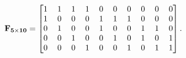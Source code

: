 \documentclass[journal]{IEEEtran}
\begin{document}
\begin{equation}\label{factor_510}
 \small
\setlength{\arraycolsep}{1pt}
\begin{aligned} \mathbf {F_{5 \times 10}}=\left [{ 
\begin{matrix} 
1 &\quad 1 &\quad 1 &\quad 1 &\quad 0 &\quad 0 &\quad 0 &\quad 0 &\quad 0 &\quad 0\\ 
1 &\quad 0 &\quad 0 &\quad 0 &\quad 1 &\quad 1 &\quad 1 &\quad 0 &\quad 0 &\quad 0\\ 
0 &\quad 1 &\quad 0 &\quad 0 &\quad 1 &\quad 0 &\quad 0 &\quad 1 &\quad 1 &\quad 0\\ 
0 &\quad 0 &\quad 1 &\quad 0 &\quad 0 &\quad 1 &\quad 0 &\quad 1 &\quad 0 &\quad 1\\ 
0 &\quad 0 &\quad 0 &\quad 1 &\quad 0 &\quad 0 &\quad 1 &\quad 0 &\quad 1 &\quad 1\\ 
\end{matrix} }\right].\end{aligned}
\end{equation}
 
\end{document}
